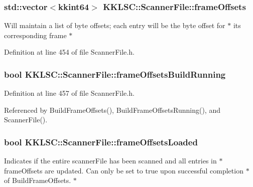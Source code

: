 \subsubsection[{\texorpdfstring{frame\+Offsets}{frameOffsets}}]{\setlength{\rightskip}{0pt plus 5cm}std\+::vector$<${\bf kkint64}$>$ K\+K\+L\+S\+C\+::\+Scanner\+File\+::frame\+Offsets\hspace{0.3cm}{\ttfamily [protected]}}\hypertarget{class_k_k_l_s_c_1_1_scanner_file_a61d36c66bb5f16ba82c088cd816b0c68}{}\label{class_k_k_l_s_c_1_1_scanner_file_a61d36c66bb5f16ba82c088cd816b0c68}
Will maintain a list of byte offsets; each entry will be the byte offset for $\ast$ its corresponding frame $\ast$ 

Definition at line 454 of file Scanner\+File.\+h.

\subsubsection[{\texorpdfstring{frame\+Offsets\+Build\+Running}{frameOffsetsBuildRunning}}]{\setlength{\rightskip}{0pt plus 5cm}bool K\+K\+L\+S\+C\+::\+Scanner\+File\+::frame\+Offsets\+Build\+Running\hspace{0.3cm}{\ttfamily [protected]}}\hypertarget{class_k_k_l_s_c_1_1_scanner_file_a14b9267dc74c7a04f1965aa39c817f70}{}\label{class_k_k_l_s_c_1_1_scanner_file_a14b9267dc74c7a04f1965aa39c817f70}


Definition at line 457 of file Scanner\+File.\+h.



Referenced by Build\+Frame\+Offsets(), Build\+Frame\+Offsets\+Running(), and Scanner\+File().

\subsubsection[{\texorpdfstring{frame\+Offsets\+Loaded}{frameOffsetsLoaded}}]{\setlength{\rightskip}{0pt plus 5cm}bool K\+K\+L\+S\+C\+::\+Scanner\+File\+::frame\+Offsets\+Loaded\hspace{0.3cm}{\ttfamily [protected]}}\hypertarget{class_k_k_l_s_c_1_1_scanner_file_ac7ebdb105a54fa09c7adc6520c2b0caa}{}\label{class_k_k_l_s_c_1_1_scanner_file_ac7ebdb105a54fa09c7adc6520c2b0caa}
Indicates if the entire scanner\+File has been scanned and all entries in $\ast$ frame\+Offsets are updated. Can only be set to \textquotesingle{}true\textquotesingle{} upon successful completion $\ast$ of \textquotesingle{}Build\+Frame\+Offsets\textquotesingle{}. $\ast$ 

